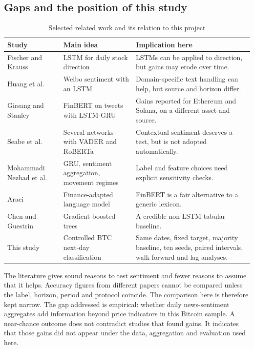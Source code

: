 \subsection{Gaps and the position of this study}
\begin{table}[htbp]\centering\small
\caption{Selected related work and its relation to this project}\label{tab:lit}
\begin{tabularx}{\textwidth}{p{3.3cm}p{2.9cm}X}
\toprule
Study & Main idea & Implication here\\\midrule
Fischer and Krauss~\cite{fischer2018} & LSTM for daily stock direction & LSTMs can be applied to direction, but gains may erode over time.\\
Huang et al.~\cite{huang2021} & Weibo sentiment with an LSTM & Domain-specific text handling can help, but source and horizon differ.\\
Girsang and Stanley~\cite{girsang2023} & FinBERT on tweets with LSTM-GRU & Gains reported for Ethereum and Solana, on a different asset and source.\\
Seabe et al.~\cite{seabe2025} & Several networks with VADER and RoBERTa & Contextual sentiment deserves a test, but is not adopted automatically.\\
Mohammadi Nezhad et al.~\cite{nezhad2026} & GRU, sentiment aggregation, movement regimes & Label and feature choices need explicit sensitivity checks.\\
Araci~\cite{araci2019} & Finance-adapted language model & FinBERT is a fair alternative to a generic lexicon.\\
Chen and Guestrin~\cite{chen2016} & Gradient-boosted trees & A credible non-LSTM tabular baseline.\\
This study & Controlled BTC next-day classification & Same dates, fixed target, majority baseline, ten seeds, paired intervals, walk-forward and lag analyses.\\
\bottomrule
\end{tabularx}
\end{table}

The literature gives sound reasons to test sentiment and fewer reasons to assume that it helps. Accuracy figures from different papers cannot be compared unless the label, horizon, period and protocol coincide. The comparison here is therefore kept narrow. The gap addressed is empirical: whether daily news-sentiment aggregates add information beyond price indicators in this Bitcoin sample. A near-chance outcome does not contradict studies that found gains. It indicates that those gains did not appear under the data, aggregation and evaluation used here.
